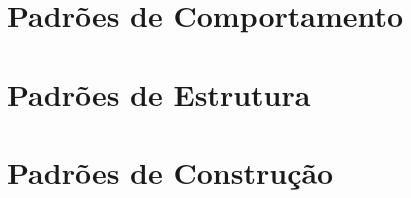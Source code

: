 

\section{Padrões de Comportamento}
\section{Padrões de Estrutura}
\section{Padrões de Construção}
